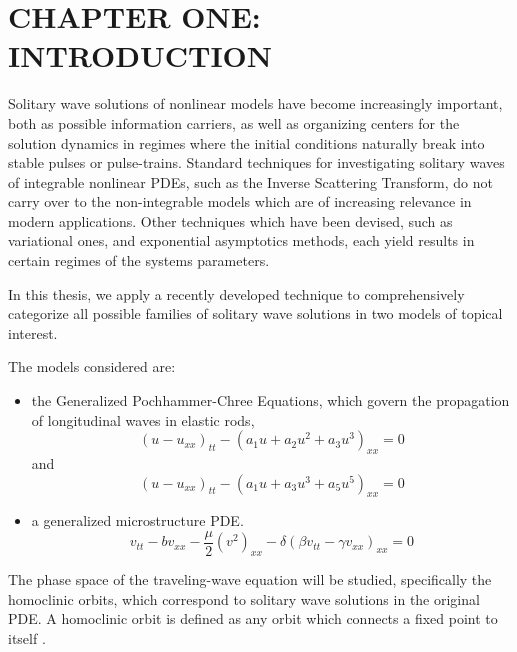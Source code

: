 \chapter{CHAPTER ONE: INTRODUCTION} \label{chapter_1}

Solitary wave solutions of nonlinear models have become increasingly
important, both as possible information carriers,
as well as organizing centers for the solution dynamics in regimes
where the initial conditions naturally break into stable pulses or
pulse-trains. Standard techniques for investigating solitary waves of
integrable nonlinear PDEs,
such as the Inverse Scattering Transform, do not carry over to the
non-integrable models which are of increasing relevance in modern
applications. Other techniques which have been devised, such as
variational ones, and exponential asymptotics methods, each yield
results in certain regimes of the systems parameters.

In this thesis, we apply a recently developed technique to
comprehensively categorize all possible families of solitary wave
solutions in two models of topical interest.

The models considered are:
\begin{itemize}
\item the Generalized Pochhammer-Chree Equations, which  govern the
propagation of longitudinal waves in elastic rods,
\begin{equation}\label{eq:GPC1}
\left( u - u_{xx} \right)_{tt} - \left( a_1 u + a_2 u^2 + a_3 u^3 \right)_{xx} =0  
\end{equation}
and
\begin{equation}  \label{eq:GPC2} 
\left( u - u_{xx} \right)_{tt} - \left( a_1 u + a_3 u^3 + a_5 u^5 \right)_{xx} =0
\end{equation}

\item a generalized microstructure PDE.
\begin{equation}\label{eq:MS}
v_{tt} - b v_{xx} - \frac{\mu}{2} \left( v^2 \right)_{xx} - \delta \left( \beta v_{tt} - \gamma v_{xx}\right)_{xx} = 0 
\end{equation}
\end{itemize}

The phase space of the traveling-wave equation will be studied, specifically 
the homoclinic orbits, which correspond to solitary wave solutions in the original
PDE. A homoclinic orbit is defined as any orbit which connects a fixed point to itself 
\cite{Strogatz}.


